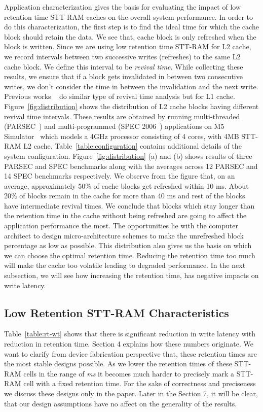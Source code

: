 Application characterization gives the basis for evaluating the impact of low retention time STT-RAM caches on the overall system performance. In order to do this characterization, the first step is to  find the ideal time for which the cache block should retain the data.  We see that, cache block is only refreshed when the block is written. Since we are using low retention time STT-RAM for L2 cache, we record intervals between two successive writes (refreshes) to the same L2 cache block. We define this interval to be {\it revival time}. While collecting these results, we ensure that if a block gets invalidated in between two consecutive writes, we don't consider the time in between the invalidation and the next write. Previous works ~\cite{brooks} do similar type of revival time analysis but for L1 cache. Figure~\ref{fig:distribution} shows the distribution of L2 cache blocks having different revival time intervals. These results are obtained by running multi-threaded (PARSEC~\cite{PARSEC}) and multi-programmed (SPEC 2006~\cite{SPEC}) applications on M5 Simulator~\cite{M5} which models a 4GHz processor consisting of 4 cores, with 4MB STT-RAM L2 cache. Table~\ref{table:configuration} contains additional details of the system configuration. Figure~\ref{fig:distribution} (a) and (b) shows results of three PARSEC and SPEC benchmarks along with the averages across 12 PARSEC  and 14 SPEC benchmarks respectively. We observe from the figure that, on an average, approximately 50\% of cache blocks get refreshed within 10 ms. About 20\% of blocks remain in the cache for more than 40 ms and rest of the blocks have intermediate revival times. We conclude that blocks which stay longer than the retention time in the cache without being refreshed are going to affect the application performance the most. The opportunities lie with the computer architect to design micro-architecture schemes to make the unrefreshed block percentage as low as possible. This distribution also gives us the basis on which we can choose the optimal retention time. Reducing the retention time too much will make the cache too volatile leading to degraded performance. In the next subsection, we will see how increasing the retention time, has negative impacts on write latency. 



\subsection{Low Retention STT-RAM Characteristics}
Table~\ref{table:rt-wt} shows that there is significant reduction in write latency with reduction in retention time. Section 4 explains how these numbers originate. We want to clarify from device fabrication perspective that, these retention times are the most stable designs possible. As we lower the retention times of these STT-RAM cells in the range of {\it ms} it becomes much harder to precisely mark a STT-RAM cell with a fixed retention time. For the sake of correctness and preciseness we discuss these designs only in the paper. Later in the Section 7, it will be clear, that our design assumptions have no affect on the generality of the results.

